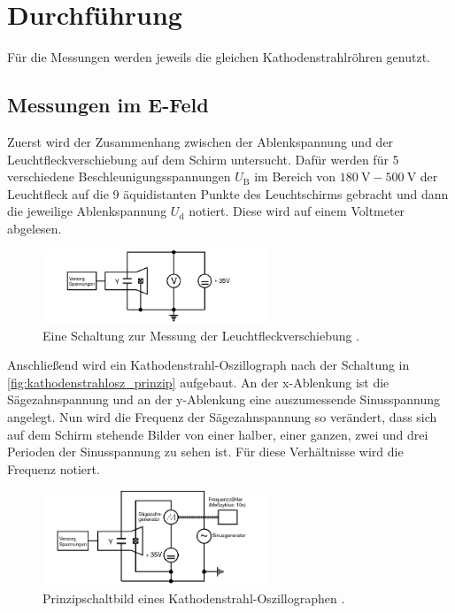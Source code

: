 \section{Durchführung}
\label{sec:Durchführung}

Für die Messungen werden jeweils die gleichen Kathodenstrahlröhren genutzt.

\subsection{Messungen im E-Feld}

    Zuerst wird der Zusammenhang zwischen der Ablenkspannung und der Leuchtfleckverschiebung auf dem Schirm untersucht. Dafür werden für 5 verschiedene 
    Beschleunigungsspannungen $U_{\text{B}}$ im Bereich von $\SI{180}{\volt} - \SI{500}{\volt}$ der Leuchtfleck auf die 9 äquidistanten Punkte des 
    Leuchtschirms gebracht und dann die jeweilige Ablenkspannung $U_{\text{d}}$ notiert. Diese wird auf einem Voltmeter abgelesen.

    \begin{figure}[H]
        \centering
        \includegraphics[width=0.6\textwidth]{bilder/messung_leuchtfleckverschiebung.jpg}
        \caption{Eine Schaltung zur Messung der Leuchtfleckverschiebung \cite{anleitung501}.}
        \label{fig:leuchtfleckverschiebung}
    \end{figure}

    \noindent Anschließend wird ein Kathodenstrahl-Oszillograph nach der Schaltung in \autoref{fig:kathodenstrahlosz_prinzip} aufgebaut. 
    An der x-Ablenkung ist die Sägezahnspannung und an der y-Ablenkung eine auszumessende Sinusspannung angelegt. Nun wird die Frequenz der
    Sägezahnspannung so verändert, dass sich auf dem Schirm stehende Bilder von einer halber, einer ganzen, zwei und drei Perioden der Sinusspannung
    zu sehen ist. Für diese Verhältnisse wird die Frequenz notiert.

    \begin{figure}[H]
        \centering
        \includegraphics[width=0.6\textwidth]{bilder/prinzipschaltbild_kathodenstrahl.png}
        \caption{Prinzipschaltbild eines Kathodenstrahl-Oszillographen \cite{anleitung501}.}
        \label{fig:kathodenstrahlosz_prinzip}
    \end{figure}

